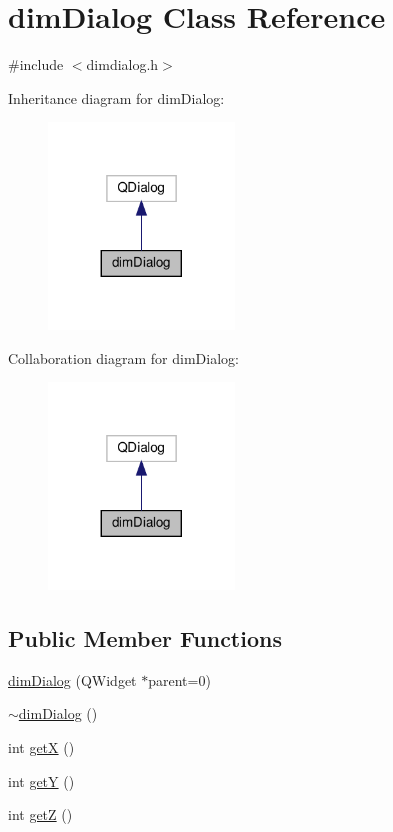 \hypertarget{classdim_dialog}{}\section{dim\+Dialog Class Reference}
\label{classdim_dialog}


{\ttfamily \#include $<$dimdialog.\+h$>$}



Inheritance diagram for dim\+Dialog\+:
\nopagebreak
\begin{figure}[H]
\begin{center}
\leavevmode
\includegraphics[width=140pt]{classdim_dialog__inherit__graph}
\end{center}
\end{figure}


Collaboration diagram for dim\+Dialog\+:
\nopagebreak
\begin{figure}[H]
\begin{center}
\leavevmode
\includegraphics[width=140pt]{classdim_dialog__coll__graph}
\end{center}
\end{figure}
\subsection*{Public Member Functions}
\begin{DoxyCompactItemize}
\item 
\hyperlink{classdim_dialog_abda7437ba444409c789daae87b76202e}{dim\+Dialog} (Q\+Widget $\ast$parent=0)
\item 
\hyperlink{classdim_dialog_a176042f4a3ee628112b5fa1a1737e297}{$\sim$dim\+Dialog} ()
\item 
int \hyperlink{classdim_dialog_a6ad381992f86793368f0b6f2a5c3c32e}{getX} ()
\item 
int \hyperlink{classdim_dialog_abac25538a87509e6486a9427f99cc85b}{getY} ()
\item 
int \hyperlink{classdim_dialog_ac1133f232d42c4e86b68faaa12af98ee}{getZ} ()
\end{DoxyCompactItemize}


